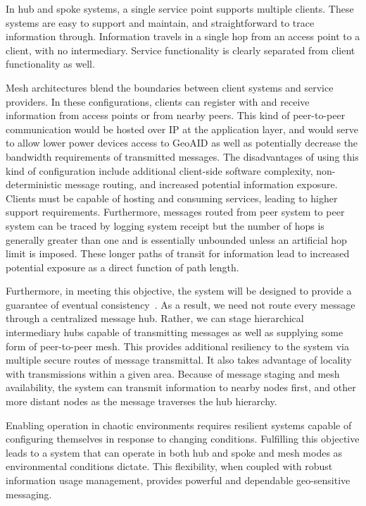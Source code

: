 \documentclass{sbir}
\begin{document}
In hub and spoke systems, a single service point supports multiple clients. These systems are easy to support and maintain, and straightforward to trace information through. Information travels in a single hop from an access point to a client, with no intermediary. Service functionality is clearly separated from client functionality as well.

Mesh architectures blend the boundaries between client systems and service providers. In these configurations, clients can register with and receive information from access points or from nearby peers. This kind of peer-to-peer communication would be hosted over IP at the application layer, and would serve to allow lower power devices access to GeoAID as well as potentially decrease the bandwidth requirements of transmitted messages. The disadvantages of using this kind of configuration include additional client-side software complexity, non-deterministic message routing, and increased potential information exposure. Clients must be capable of hosting and consuming services, leading to higher support requirements. Furthermore, messages routed from peer system to peer system can be traced by logging system receipt but the number of hops is generally greater than one and is essentially unbounded unless an artificial hop limit is imposed. These longer paths of transit for information lead to increased potential exposure as a direct function of path length.

Furthermore, in meeting this objective, the system will be designed to provide a guarantee of eventual consistency~\cite{LiPoClGePrNuRo:12}. As a result, we need not route every message through a centralized message hub. Rather, we can stage hierarchical intermediary hubs capable of transmitting messages as well as supplying some form of peer-to-peer mesh. This provides additional resiliency to the system via multiple secure routes of message transmittal. It also takes advantage of locality with transmissions within a given area. Because of message staging and mesh availability, the system can transmit information to nearby nodes first, and other more distant nodes as the message traverses the hub hierarchy.

Enabling operation in chaotic environments requires resilient systems capable of configuring themselves in response to changing conditions. Fulfilling this objective leads to a system that can operate in both hub and spoke and mesh modes as environmental conditions dictate. This flexibility, when coupled with robust information usage management, provides powerful and dependable geo-sensitive messaging.
\end{document}
